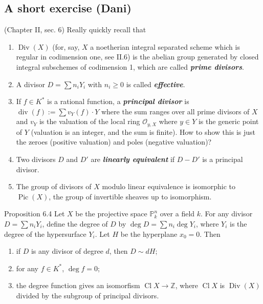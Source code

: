 \subsection{A short exercise (Dani)}

(Chapter II, sec. 6) Really quickly recall that 
\begin{enumerate}
\item $\operatorname{Div}(X)$ (for, say, $X$ a noetherian integral separated scheme which is regular in codimension one, see II.6) is the abelian group generated by closed integral subschemes of codimension 1, which are called \textit{\textbf{prime divisors}}.
\item  A divisor $D=\sum n_i Y_i$ with $n_i\geq 0$ is called \textit{\textbf{effective}}.
\item  If $f \in K^*$ is a rational function, a \textit{\textbf{principal divisor}} is $\operatorname{div}(f):=\sum v_Y(f)\cdot Y$ where the sum ranges over all prime divisors of $X$ and $v_Y$ is the valuation of the local ring $\mathcal{O}_{y,X}$ where $y\in Y$ is the generic point of $Y$ (valuation is an integer, and the sum is finite). {\color{2}How to show this is just the zeroes (positive valuation) and poles (negative valuation)?}
\item  Two divisors $D$ and  $D'$ are \textit{\textbf{linearly equivalent}} if $D-D'$ is a principal divisor.
\item The group of divisors of $X$ modulo linear equivalence is isomorphic to $\operatorname{Pic}(X)$, the group of invertible sheaves up to isomorphism.
\end{enumerate}

\begin{thing5}{Proposition 6.4}\leavevmode
	Let $X$ be the projective space $\mathbb{P}^n_k$ over a field $k$. For any divisor $D=\sum n_iY_i$, define the degree of $D$ by $\operatorname{deg}D=\sum n_i\operatorname{deg}Y_i$, where $Y_i$ is the degree of the hypersurface $Y_i$. Let $H$ be the hyperplane $x_0=0$. Then
	\begin{enumerate}[label=(\alph*)]
	\item if $D$ is any divisor of degree $d$, then $D\sim dH$;
	\item for any $f \in K^*$, $\operatorname{deg}f=0$;
\item the degree function gives an isomorfism $\operatorname{Cl}X\to\mathbb{Z}$, where $\operatorname{Cl}X$ is $\operatorname{Div}(X)$ divided by the subgroup of principal divisors. 
\end{enumerate}
\end{thing5}


